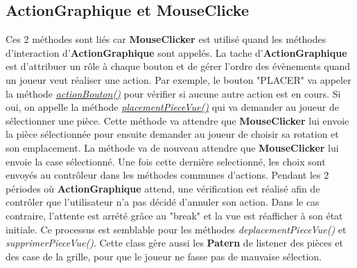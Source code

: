         \subsection{ActionGraphique et MouseClicke}
        Ces 2 méthodes sont liés car \textbf{MouseClicker} est utilisé quand les méthodes d'interaction d'\textbf{ActionGraphique} sont appelés. La tache d'\textbf{ActionGraphique} est d'attribuer un rôle à chaque bouton et de gérer l'ordre des évènements quand un joueur veut réaliser une action. Par exemple, le bouton "PLACER" va appeler la méthode \underline{\textit{actionBouton()}} pour vérifier si aucune autre action est en cours. Si oui, on appelle la méthode \underline{\textit{placementPieceVue()}} qui va demander au joueur de sélectionner une pièce. Cette méthode va attendre que \textbf{MouseClicker} lui envoie la pièce sélectionnée pour ensuite demander au joueur de choisir sa rotation et son emplacement. La méthode va de nouveau attendre que \textbf{MouseClicker} lui envoie la case sélectionné. Une fois cette dernière selectionné, les choix sont envoyés au contrôleur dans les méthodes communes d'actions. Pendant les 2 périodes où \textbf{ActionGraphique} attend, une vérification est réalisé afin de contrôler que l'utilisateur n'a pas décidé d'annuler son action. Dans le cas contraire, l'attente est arrété grâce au "break" et la vue est réafficher à son état initiale. Ce processus est semblable pour les méthodes \textit{deplacementPieceVue()} et \textit{supprimerPieceVue()}. Cette class gère aussi les \textbf{Patern} de listener des pièces et des case de la grille, pour que le joueur ne fasse pas de mauvaise sélection.


        
